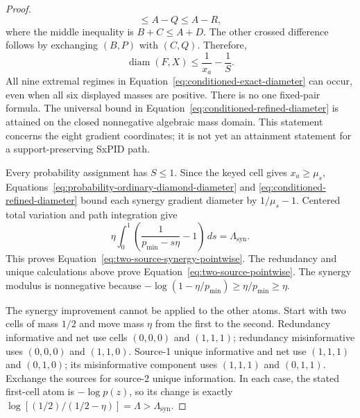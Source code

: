\documentclass[11pt]{article}
\theoremstyle{definition}
\begin{document}
\begin{proof}
\[  \le A-Q
  \le A-R,
\]
where the middle inequality is $B+C\le A+D$.  The other crossed difference follows by exchanging
$(B,P)$ with $(C,Q)$.  Therefore,
\begin{equation}\label{eq:conditioned-refined-diameter}
  \operatorname{diam}(F,X)
  \le
  \frac1{x_a}-\frac1S.
\end{equation}
All nine extremal regimes in Equation~\eqref{eq:conditioned-exact-diameter} can occur, even when
all six displayed masses are positive.  There is no one fixed-pair formula.  The universal bound
in Equation~\eqref{eq:conditioned-refined-diameter} is attained on the closed nonnegative algebraic
mass domain.  This statement concerns the eight gradient coordinates; it is not yet an attainment
statement for a support-preserving SxPID path.

Every probability assignment has $S\le1$.  Since the keyed cell gives $x_a\ge\mu_s$,
Equations~\eqref{eq:probability-ordinary-diamond-diameter} and
\eqref{eq:conditioned-refined-diameter} bound each synergy gradient diameter by
$1/\mu_s-1$.  Centered total variation and path integration give
\begin{equation}
  \eta\int_0^1
    \left(\frac1{p_{\min}-s\eta}-1\right)\,ds
  =
  \Lambda_{\mathrm{syn}}.
\end{equation}
This proves Equation~\eqref{eq:two-source-synergy-pointwise}.  The redundancy and unique
calculations above prove Equation~\eqref{eq:two-source-pointwise}.
The synergy modulus is nonnegative because
$-\log(1-\eta/p_{\min})\ge\eta/p_{\min}\ge\eta$.

The synergy improvement cannot be applied to the other atoms.  Start with two cells of mass
$1/2$ and move mass $\eta$ from the first to the second.  Redundancy informative and net use
cells $(0,0,0)$ and $(1,1,1)$; redundancy misinformative uses $(0,0,0)$ and $(1,1,0)$.
Source-1 unique informative and net use $(1,1,1)$ and $(0,1,0)$; its misinformative component
uses $(1,1,1)$ and $(0,1,1)$.  Exchange the sources for source-2 unique information.  In each
case, the stated first-cell atom is $-\log p(z)$, so its change is exactly
$\log[(1/2)/(1/2-\eta)]=\Lambda>\Lambda_{\mathrm{syn}}$.


\end{proof}
\end{document}
